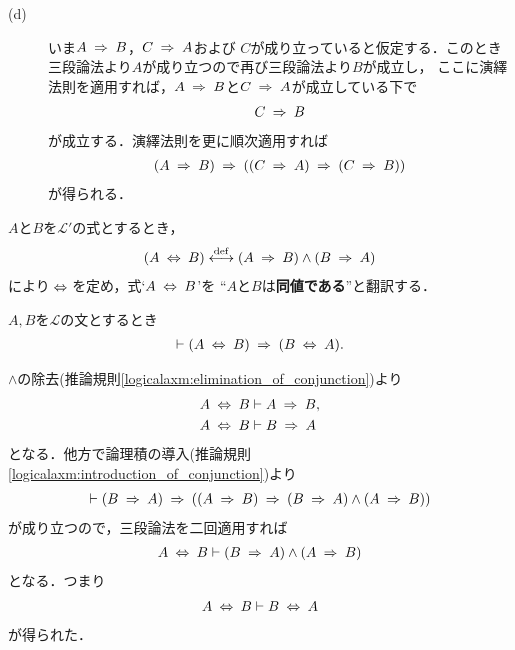 \begin{prf}
\begin{description}
			\item[(d)]
				いま$A \rarrow B$，$C \rarrow A$および
				$C$が成り立っていると仮定する．このとき三段論法より$A$が成り立つので再び三段論法より$B$が成立し，
				ここに演繹法則を適用すれば，$A \rarrow B$と$C \rarrow A$が成立している下で
				\begin{align}
					C \rarrow B
				\end{align}
				が成立する．演繹法則を更に順次適用すれば
				\begin{align}
					(A \rarrow B) \rarrow ( (C \rarrow A) \rarrow (C \rarrow B) )
				\end{align}
				が得られる．
				\QED
		\end{description}
	\end{prf}
	
	$A$と$B$を$\mathcal{L}'$の式とするとき，
	\begin{align}
		(A \lrarrow B) \defarrow
		(A \rarrow B) \wedge (B \rarrow A)
	\end{align}
	により$\lrarrow$を定め，式`$A \lrarrow B$'を
	``$A$と$B$は{\bf 同値である}''と翻訳する．
	
	\begin{screen}
		\begin{logicalthm}[同値関係の対称律]
		\label{logicalthm:symmetry_of_equivalence_arrows}
			$A,B$を$\mathcal{L}$の文とするとき
			\begin{align}
				\vdash (A \lrarrow B) \rarrow (B \lrarrow A).
			\end{align}
		\end{logicalthm}
	\end{screen}
	
	\begin{prf}
		$\wedge$の除去(推論規則\ref{logicalaxm:elimination_of_conjunction})より
		\begin{align}
			A \lrarrow B &\vdash A \rarrow B, \\
			A \lrarrow B &\vdash B \rarrow A
		\end{align}
		となる．他方で論理積の導入(推論規則\ref{logicalaxm:introduction_of_conjunction})より
		\begin{align}
			\vdash (B \rarrow A) \rarrow ((A \rarrow B) \rarrow 
			(B \rarrow A) \wedge (A \rarrow B))
		\end{align}
		が成り立つので，三段論法を二回適用すれば
		\begin{align}
			A \lrarrow B \vdash (B \rarrow A) \wedge (A \rarrow B)
		\end{align}
		となる．つまり
		\begin{align}
			A \lrarrow B \vdash B \lrarrow A
		\end{align}
		が得られた．
		\QED
	\end{prf}
	
